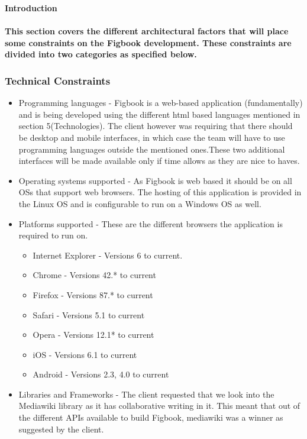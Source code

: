 

\textbf{Introduction}\paragraph{This section covers the different architectural factors that will place some constraints on the Figbook development. These constraints are divided into two categories as specified below. } 

\subsubsection{Technical Constraints}
\begin{itemize}
\item Programming languages - Figbook is a web-based application (fundamentally) and is being developed using the different html based languages mentioned in section 5(Technologies). The client however was requiring that there should be desktop and mobile interfaces, in which case the team will have to use programming languages outside the mentioned ones.These two additional interfaces will be made available only if time allows as they are nice to haves.

\item Operating systems supported - As Figbook is web based it should be on all OSs that support web browsers. The hosting of this application is provided in the Linux OS and is configurable to run on a Windows OS as well. 
\item Platforms supported -  These are the different browsers the application is required to run on.
\begin{itemize}
\item Internet Explorer -  Versions 6 to current.
\item Chrome -  Versions 42.* to current
\item Firefox -  Versions 87.* to current
\item Safari -  Versions 5.1 to current
\item Opera -  Versions 12.1* to current
\item iOS -  Versions 6.1 to current
\item Android -  Versions 2.3, 4.0 to current
\end{itemize}
\item Libraries and Frameworks - The client requested that we look into the Mediawiki library as it has collaborative writing in it. This meant that out of the different APIs available to build Figbook, mediawiki was a winner as suggested by the client.
\end{itemize}

